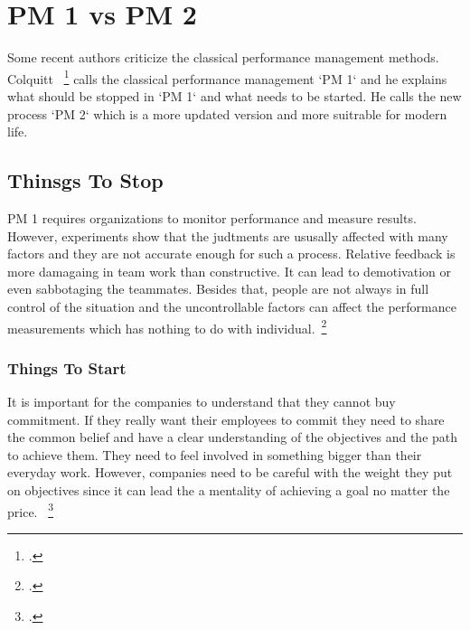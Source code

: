 \newpage
\section{PM 1 vs PM 2} \label{PM2}

Some recent authors criticize the classical performance management methods. Colquitt ~\footcite[See. ][]{Colquitt2017} calls the classical performance management `PM 1` and he explains what should be stopped in `PM 1` and what needs to be started. He calls the new process `PM 2` which is a more updated version and more suitrable for modern life.
\subsection{Thinsgs To Stop}

PM 1 requires organizations to monitor performance and measure results. However, experiments show that the judtments are ususally affected with many factors and they are not accurate enough for such a process. Relative feedback is more damagaing in team work than constructive. It can lead to demotivation or even sabbotaging the teammates. Besides that, people are not always in full control of the situation and the uncontrollable factors can affect the performance measurements which has nothing to do with individual.~\footcite[See. ][]{Colquitt2017}

\subsubsection{Things To Start}

It is important for the companies to understand that they cannot buy commitment. If they really want their employees to commit they need to share the common belief and have a clear understanding of the objectives and the path to achieve them. They need to feel involved in something bigger than their everyday work. However, companies need to be careful with the weight they put on objectives since it can lead the a mentality of achieving a goal no matter the price. ~\footcite[See. ][]{Colquitt2017}





